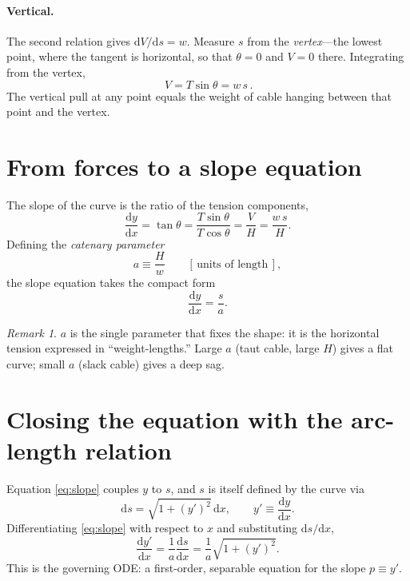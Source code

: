\documentclass[11pt]{article}
\theoremstyle{remark}
\newtheorem*{remark}{Remark}
\newcommand{\dd}{\mathrm{d}}
\begin{document}
\paragraph{Vertical.} The second relation gives $\dd V/\dd s = w$. Measure $s$ from the
\emph{vertex}---the lowest point, where the tangent is horizontal, so that $\theta=0$ and
$V=0$ there. Integrating from the vertex,
\begin{equation}
  \boxed{\,V = T\sin\theta = w\,s\,}.
  \label{eq:Vlinear}
\end{equation}
The vertical pull at any point equals the weight of cable hanging between that point and
the vertex.

\section{From forces to a slope equation}
The slope of the curve is the ratio of the tension components,
\begin{equation}
  \frac{\dd y}{\dd x} = \tan\theta
  = \frac{T\sin\theta}{T\cos\theta}
  = \frac{V}{H}
  = \frac{w\,s}{H}.
\end{equation}
Defining the \emph{catenary parameter}
\begin{equation}
  a \equiv \frac{H}{w} \qquad [\,\text{units of length}\,],
\end{equation}
the slope equation takes the compact form
\begin{equation}
  \frac{\dd y}{\dd x} = \frac{s}{a}.
  \label{eq:slope}
\end{equation}

\begin{remark}
$a$ is the single parameter that fixes the shape: it is the horizontal tension expressed
in ``weight-lengths.'' Large $a$ (taut cable, large $H$) gives a flat curve; small $a$
(slack cable) gives a deep sag.
\end{remark}

\section{Closing the equation with the arc-length relation}
Equation \eqref{eq:slope} couples $y$ to $s$, and $s$ is itself defined by the curve via
\begin{equation}
  \dd s = \sqrt{1+(y')^2}\,\dd x, \qquad y' \equiv \frac{\dd y}{\dd x}.
\end{equation}
Differentiating \eqref{eq:slope} with respect to $x$ and substituting $\dd s/\dd x$,
\begin{equation}
  \frac{\dd y'}{\dd x} = \frac{1}{a}\frac{\dd s}{\dd x}
  = \frac{1}{a}\sqrt{1+(y')^2}.
  \label{eq:ode}
\end{equation}
This is the governing ODE: a first-order, separable equation for the slope $p\equiv y'$.
\end{document}
